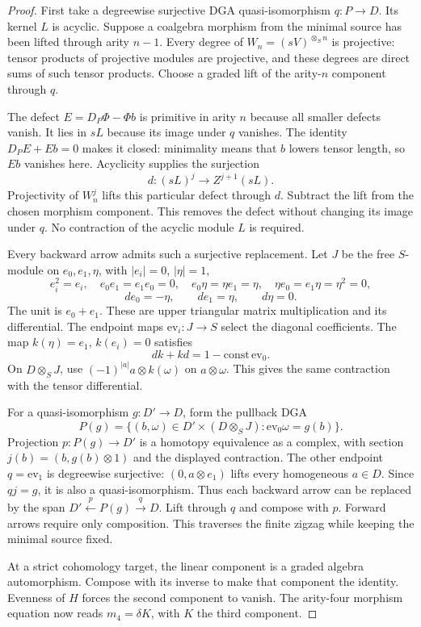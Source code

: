 \begin{proof}
First take a degreewise surjective DGA quasi-isomorphism $q:P\to D$.
Its kernel $L$ is acyclic.
Suppose a coalgebra morphism from the minimal source has been lifted
through arity $n-1$.
Every degree of $W_n=(sV)^{\otimes_S n}$ is projective:
tensor products of projective modules are projective, and these degrees
are direct sums of such tensor products.
Choose a graded lift of the arity-$n$ component through $q$.

The defect $E=D_P\Phi-\Phi b$ is primitive in arity $n$ because
all smaller defects vanish.
It lies in $sL$ because its image under $q$ vanishes.
The identity $D_PE+Eb=0$ makes it closed:
minimality means that $b$ lowers tensor length, so $Eb$ vanishes here.
Acyclicity supplies the surjection
\[
 d:(sL)^j\longrightarrow Z^{j+1}(sL).
\]
Projectivity of $W_n^j$ lifts this particular defect through $d$.
Subtract the lift from the chosen morphism component.
This removes the defect without changing its image under $q$.
No contraction of the acyclic module $L$ is required.

Every backward arrow admits such a surjective replacement.
Let $J$ be the free $S$-module on $e_0,e_1,\eta$, with
$|e_i|=0$, $|\eta|=1$,
\[
 e_i^2=e_i,\quad e_0e_1=e_1e_0=0,\quad
 e_0\eta=\eta e_1=\eta,\quad
 \eta e_0=e_1\eta=\eta^2=0,
\]
\[
 de_0=-\eta,\qquad de_1=\eta,\qquad d\eta=0.
\]
The unit is $e_0+e_1$.
These are upper triangular matrix multiplication and its differential.
The endpoint maps $\mathrm{ev}_i:J\to S$ select the diagonal coefficients.
The map $k(\eta)=e_1$, $k(e_i)=0$ satisfies
\[
 dk+kd=1-\mathrm{const}\,\mathrm{ev}_0.
\]
On $D\otimes_S J$, use $(-1)^{|a|}a\otimes k(\omega)$ on $a\otimes\omega$.
This gives the same contraction with the tensor differential.

For a quasi-isomorphism $g:D'\to D$, form the pullback DGA
\[
 P(g)=\{(b,\omega)\in D'\times(D\otimes_S J):
             \mathrm{ev}_0\omega=g(b)\}.
\]
Projection $p:P(g)\to D'$ is a homotopy equivalence as a complex,
with section $j(b)=(b,g(b)\otimes1)$ and the displayed contraction.
The other endpoint $q=\mathrm{ev}_1$ is degreewise surjective:
$(0,a\otimes e_1)$ lifts every homogeneous $a\in D$.
Since $qj=g$, it is also a quasi-isomorphism.
Thus each backward arrow can be replaced by the span
$D'\xleftarrow{p}P(g)\xrightarrow{q}D$.
Lift through $q$ and compose with $p$.
Forward arrows require only composition.
This traverses the finite zigzag while keeping the minimal source fixed.

At a strict cohomology target, the linear component is a graded algebra automorphism.
Compose with its inverse to make that component the identity.
Evenness of $H$ forces the second component to vanish.
The arity-four morphism equation now reads $m_4=\delta K$,
with $K$ the third component.
\end{proof}

